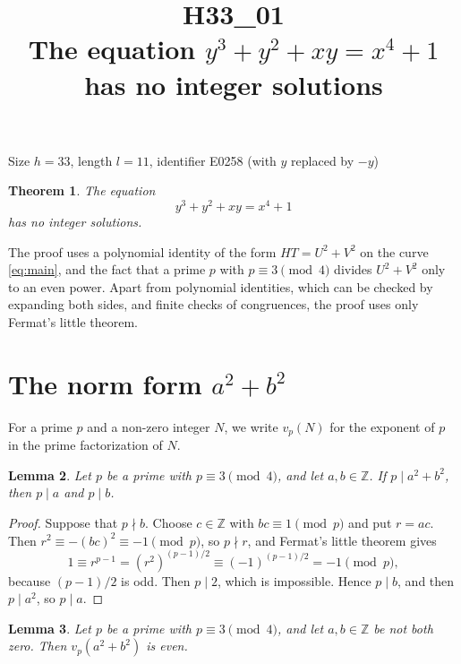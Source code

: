 \documentclass[11pt]{article}
\title{\textbf{H33\_01}\\[4pt] The equation $y^3+y^2+xy=x^4+1$ has no integer solutions}
\author{}
\date{}
\newtheorem{theorem}{Theorem}
\newtheorem{lemma}[theorem]{Lemma}
\newcommand{\Z}{\mathbb{Z}}
\begin{document}
\maketitle
\vspace{-8ex}
\begin{center}
Size $h=33$, length $l=11$, identifier E0258 (with $y$ replaced by $-y$)
\end{center}

\begin{theorem}\label{thm:main}
The equation
\begin{equation}\label{eq:main}
y^3+y^2+xy=x^4+1
\end{equation}
has no integer solutions.
\end{theorem}

The proof uses a polynomial identity of the form $HT=U^2+V^2$ on the curve \eqref{eq:main}, and the fact that a prime $p$ with $p\equiv3\pmod4$ divides $U^2+V^2$ only to an even power. Apart from polynomial identities, which can be checked by expanding both sides, and finite checks of congruences, the proof uses only Fermat's little theorem.

\section{\texorpdfstring{The norm form $a^2+b^2$}{The norm form}}

For a prime $p$ and a non-zero integer $N$, we write $v_p(N)$ for the exponent of $p$ in the prime factorization of $N$.

\begin{lemma}\label{lem:divides}
Let $p$ be a prime with $p\equiv3\pmod4$, and let $a,b\in\Z$. If $p\mid a^2+b^2$, then $p\mid a$ and $p\mid b$.
\end{lemma}

\begin{proof}
Suppose that $p\nmid b$. Choose $c\in\Z$ with $bc\equiv1\pmod p$ and put $r=ac$. Then $r^2\equiv-(bc)^2\equiv-1\pmod p$, so $p\nmid r$, and Fermat's little theorem gives
\[
1\equiv r^{p-1}=(r^2)^{(p-1)/2}\equiv(-1)^{(p-1)/2}=-1\pmod p,
\]
because $(p-1)/2$ is odd. Then $p\mid2$, which is impossible. Hence $p\mid b$, and then $p\mid a^2$, so $p\mid a$.
\end{proof}

\begin{lemma}\label{lem:even}
Let $p$ be a prime with $p\equiv3\pmod4$, and let $a,b\in\Z$ be not both zero. Then $v_p(a^2+b^2)$ is even.
\end{lemma}
\end{document}
